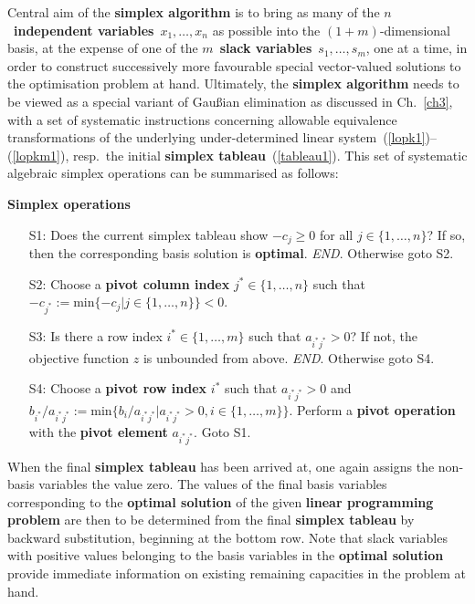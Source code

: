 \medskip
\noindent
Central aim of the {\bf simplex algorithm} is to bring as many of 
the $n$~{\bf independent variables}~$x_{1}, \ldots, x_{n}$ as 
possible into the $(1+m)$-dimensional basis, at the expense of one 
of the $m$~{\bf slack variables}~$s_{1}, \ldots, s_{m}$, one at a 
time, in order to construct successively more favourable special 
vector-valued solutions to the optimisation problem at hand. 
Ultimately, the {\bf simplex algorithm} needs to be viewed as a 
special variant of Gau\ss ian elimination as discussed in 
Ch.~\ref{ch3}, with a set of systematic instructions concerning 
allowable equivalence transformations of the underlying 
under-determined linear system~(\ref{lopk1})--(\ref{lopkm1}), 
resp.\ the initial {\bf simplex tableau}~(\ref{tableau1}). This 
set of systematic algebraic simplex operations can be summarised 
as follows:

\medskip
\noindent
{\bf Simplex operations}
\nopagebreak
\begin{itemize}
\item[S1:] Does the current simplex tableau show $-c_{j} \geq 0$
for all $j \in \{1,\ldots,n\}$? If so, then the corresponding basis solution is {\bf optimal}. {\it END}. Otherwise goto S2.

\item[S2:] Choose a {\bf pivot column index} $j^{*} \in
\{1,\ldots,n\}$ such that $-c_{j^{*}}:= \text{min}\{-c_{j}|j
\in \{1,\ldots,n\}\} < 0$.

\item[S3:] Is there a row index $i^{*} \in \{1,\ldots,m\}$ such that $a_{i^{*}j^{*}} > 0$? If not, the objective function $z$ is unbounded from above. {\it END}. Otherwise goto S4.

\item[S4:] Choose a {\bf pivot row index} $i^{*}$ such that
$a_{i^{*}j^{*}} > 0$ and $b_{i^{*}}/a_{i^{*}j^{*}}
:=\text{min}\{b_{i}/a_{i^{*}j^{*}}|a_{i^{*}j^{*}} > 0,
i \in \{1,\ldots,m\}\}$. Perform a {\bf pivot operation} with the 
{\bf pivot element} $a_{i^{*}j^{*}}$. Goto S1.
\end{itemize}

\medskip
\noindent
When the final {\bf simplex tableau} has been arrived at, one 
again assigns the non-basis variables the value zero. The values 
of the final basis variables corresponding to the {\bf optimal 
solution} of the given {\bf linear programming problem} are then 
to be determined from the final {\bf simplex tableau} by backward 
substitution, beginning at the bottom row. Note that slack 
variables with positive values belonging to the basis variables in 
the {\bf optimal solution} provide immediate information on 
existing remaining capacities in the problem at hand.


